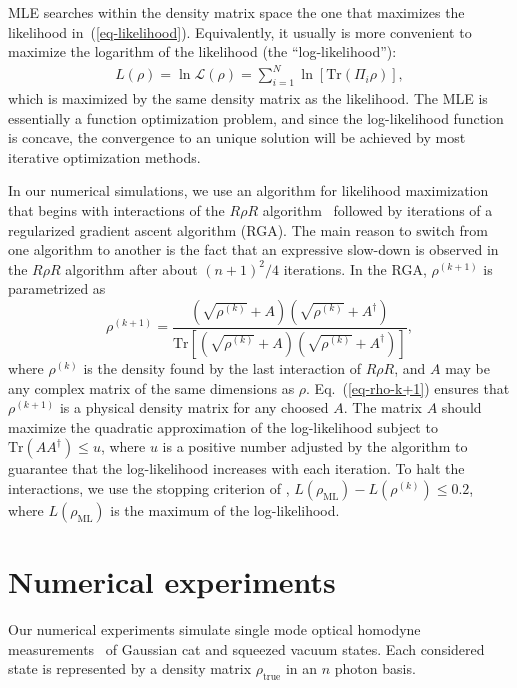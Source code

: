 \documentclass[
reprint,
superscriptaddress,
showpacs,
amsmath,
amssymb,
aps,
pra,
longbibliography
]{revtex4-1}
\begin{document}
MLE searches within the density matrix space the one that maximizes the likelihood in~(\ref{eq-likelihood}). Equivalently, 
it usually is more convenient to maximize the logarithm of the likelihood (the ``log-likelihood''):
\begin{eqnarray}
L (\rho) = \ln \mathcal{L} (\rho)= \sum_{i=1}^{N} \ln [\mathrm{Tr} (\Pi_i \rho)],
\end{eqnarray} 
which is maximized by the same density matrix as the likelihood. The MLE is essentially a function optimization problem, and 
since the log-likelihood function is concave, the convergence to an unique solution will be achieved by most iterative optimization methods.

In our numerical simulations, we use an algorithm for likelihood maximization that begins with interactions of the $R\rho R$ algorithm~\cite{Rehacek2007} 
followed by iterations of a regularized gradient ascent algorithm (RGA). The main reason to switch from one algorithm to another is the fact that an 
expressive slow-down is observed in the $R\rho R$ algorithm after about $(n+1)^2/4$ iterations. In the RGA, $\rho^{(k+1)}$ is parametrized as 
\begin{equation}
  \rho^{(k+1)}=\frac{\left(\sqrt{\rho^{(k)}}+A\right)\left(\sqrt{\rho^{(k)}}+A^{\dagger}\right)}{\mathrm{Tr}\left[\left(\sqrt{\rho^{(k)}}+A\right)\left(\sqrt{\rho^{(k)}}+A^{\dagger}\right)\right]},
\label{eq-rho-k+1}
\end{equation}
where $\rho^{(k)}$ is the density found by the last interaction of $R \rho R$, and $A$ may be any complex matrix of the same dimensions as $\rho$. 
Eq.~(\ref{eq-rho-k+1}) ensures that $\rho^{(k+1)}$ is a physical density matrix for any choosed $A$. The matrix $A$ should maximize the quadratic
approximation of the log-likelihood subject to $\text{Tr}(AA^{\dagger})\leq u$, where $u$ is a positive number adjusted by the algorithm to guarantee 
that the log-likelihood increases with each iteration. To halt the interactions, we use the stopping criterion of \cite{Glancy2012}, 
$L(\rho_{\text{ML}})-L(\rho^{(k)})\leq 0.2$, where $L(\rho_{\text{ML}})$ is the maximum of the log-likelihood.


\section{Numerical experiments}
\label{numerical-experiments}
Our numerical experiments simulate single mode optical homodyne
measurements~\cite{Lvovsky2009} of Gaussian cat and squeezed vacuum states. 
Each considered state is represented by a density matrix $\rho_{\mathrm{true}}$ in an $n$ photon basis. 
\end{document}
